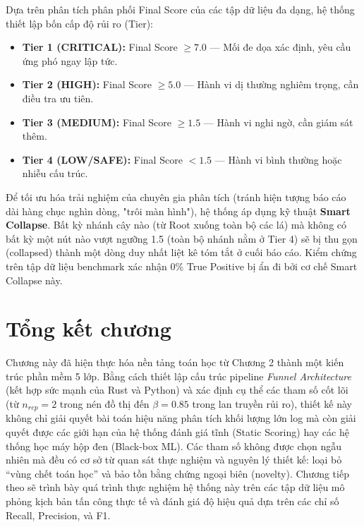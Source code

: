 \documentclass[../main.tex]{subfiles}
\begin{document}
Dựa trên phân tích phân phối Final Score của các tập dữ liệu đa dạng, hệ thống thiết lập bốn cấp độ rủi ro (Tier):
\begin{itemize}
    \item \textbf{Tier 1 (CRITICAL):} Final Score $\ge 7.0$ — Mối đe dọa xác định, yêu cầu ứng phó ngay lập tức.
    \item \textbf{Tier 2 (HIGH):} Final Score $\ge 5.0$ — Hành vi dị thường nghiêm trọng, cần điều tra ưu tiên.
    \item \textbf{Tier 3 (MEDIUM):} Final Score $\ge 1.5$ — Hành vi nghi ngờ, cần giám sát thêm.
    \item \textbf{Tier 4 (LOW/SAFE):} Final Score $< 1.5$ — Hành vi bình thường hoặc nhiễu cấu trúc.
\end{itemize}

Để tối ưu hóa trải nghiệm của chuyên gia phân tích (tránh hiện tượng báo cáo dài hàng chục nghìn dòng, "trôi màn hình"), hệ thống áp dụng kỹ thuật \textbf{Smart Collapse}. Bất kỳ nhánh cây nào (từ Root xuống toàn bộ các lá) mà không có bất kỳ một nút nào vượt ngưỡng 1.5 (toàn bộ nhánh nằm ở Tier 4) sẽ bị thu gọn (collapsed) thành một dòng duy nhất liệt kê tóm tắt ở cuối báo cáo. Kiểm chứng trên tập dữ liệu benchmark xác nhận 0\% True Positive bị ẩn đi bởi cơ chế Smart Collapse này.
\section{Tổng kết chương}
\label{section:3.9}

Chương này đã hiện thực hóa nền tảng toán học từ Chương 2 thành một kiến trúc phần mềm 5 lớp. Bằng cách thiết lập cấu trúc pipeline \textit{Funnel Architecture} (kết hợp sức mạnh của Rust và Python) và xác định cụ thể các tham số cốt lõi (từ $n_{rep}=2$ trong nén đồ thị đến $\beta=0.85$ trong lan truyền rủi ro), thiết kế này không chỉ giải quyết bài toán hiệu năng phân tích khối lượng lớn log mà còn giải quyết được các giới hạn của hệ thống đánh giá tĩnh (Static Scoring) hay các hệ thống học máy hộp đen (Black-box ML). Các tham số không được chọn ngẫu nhiên mà đều có cơ sở từ quan sát thực nghiệm và nguyên lý thiết kế: loại bỏ ``vùng chết toán học'' và bảo tồn bằng chứng ngoại biên (novelty). Chương tiếp theo sẽ trình bày quá trình thực nghiệm hệ thống này trên các tập dữ liệu mô phỏng kịch bản tấn công thực tế và đánh giá độ hiệu quả dựa trên các chỉ số Recall, Precision, và F1.
\end{document}
